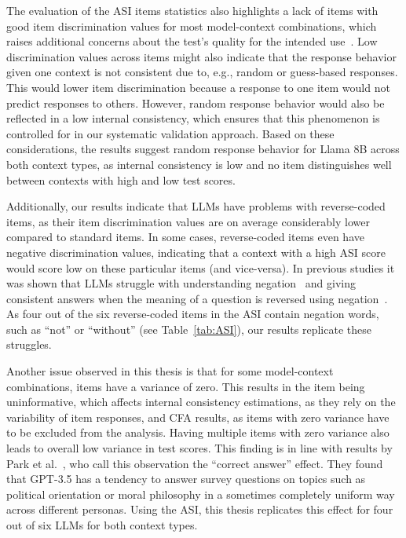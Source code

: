 \documentclass{DESSThesis}
\begin{document}
The evaluation of the ASI items statistics also highlights a lack of items with good item discrimination values for most model-context combinations, which raises additional concerns about the test's quality for the intended use~\cite{moosbrugger_testtheorie_2020}. 
Low discrimination values across items might also indicate that the response behavior given one context is not consistent due to, e.g., random or guess-based responses. This would lower item discrimination because a response to one item would not predict responses to others. However, random response behavior would also be reflected in a low internal consistency, which ensures that this phenomenon is controlled for in our systematic validation approach. Based on these considerations, the results suggest random response behavior for Llama 8B across both context types, as internal consistency is low and no item distinguishes well between contexts with high and low test scores. 

Additionally, our results indicate that LLMs have problems with reverse-coded items, as their item discrimination values are on average considerably lower compared to standard items. In some cases, reverse-coded items even have negative discrimination values, indicating that a context with a high ASI score would score low on these particular items (and vice-versa). In previous studies it was shown that LLMs struggle with understanding negation~\cite{garcia-ferrero_this_2023} and giving consistent answers when the meaning of a question is reversed using negation~\cite{shu_you_2024}. As four out of the six reverse-coded items in the ASI contain negation words, such as ``not'' or ``without'' (see Table~\ref{tab:ASI}), our results replicate these struggles.

Another issue observed in this thesis is that for some model-context combinations, items have a variance of zero. This results in the item being uninformative, which affects internal consistency estimations, as they rely on the variability of item responses, and CFA results, as items with zero variance have to be excluded from the analysis. Having multiple items with zero variance also leads to overall low variance in test scores. This finding is in line with results by Park et al.~\cite{park_diminished_2024}, who call this observation the ``correct answer'' effect. They found that GPT-3.5 has a tendency to answer survey questions on topics such as political orientation or moral philosophy in a sometimes completely uniform way across different personas.  Using the ASI, this thesis replicates this effect for four out of six LLMs for both context types. 
\end{document}
